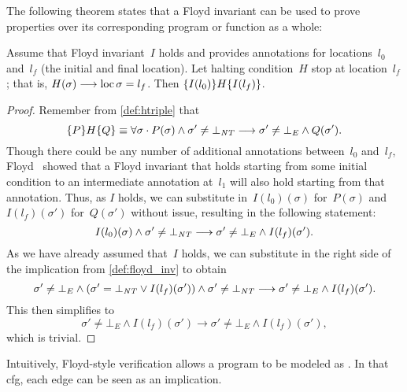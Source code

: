 The following theorem states that a Floyd invariant
can be used to prove properties over its corresponding program or function
as a whole:
\begin{theorem}
  Assume that Floyd invariant~$I$ holds and provides annotations for locations~$l_0$ and~$l_f$ (the initial and final location).
  Let halting condition~$H$ stop at location~$l_f$;
  that is, $H(\sigma)\longrightarrow\operatorname{loc}\sigma=l_f$.
  Then $\{I(l_0)\}H\{I(l_f)\}$.
\end{theorem}
\begin{proof}
  Remember from \cref{def:htriple} that
  \begin{equation*}
    \{P\}H\{Q\}\equiv\forall\sigma\cdot
    P(\sigma)\wedge\sigma'\neq\bot_{\mathit{NT}}\longrightarrow
    \sigma'\neq\bot_E\wedge Q(\sigma').
  \end{equation*}
  Though there could be any number of additional annotations between~$l_0$
  and~$l_f$, Floyd~\citep{floyd1967assigning} showed that a Floyd invariant that holds
  starting from some initial condition to an intermediate annotation at~$l_1$
  will also hold starting from that annotation.
  Thus, as $I$ holds, we can substitute in~$I(l_0)(\sigma)$ for~$P(\sigma)$
  and~$I(l_f)(\sigma')$ for~$Q(\sigma')$ without issue,
  resulting in the following statement:
  \begin{equation*}
      I(l_0)(\sigma)\wedge\sigma'\neq\bot_{\mathit{NT}}\longrightarrow
      \sigma'\neq\bot_E\wedge I(l_f)(\sigma').
  \end{equation*}
  As we have already assumed that~$I$ holds,
  we can substitute in the right side of the implication from \cref{def:floyd_inv}
  to obtain
  \begin{equation*}
    \sigma'\neq\bot_E\wedge(\sigma'=\bot_{\mathit{NT}}\vee I(l_f)(\sigma'))\wedge
    \sigma'\neq\bot_{\mathit{NT}}\longrightarrow
    \sigma'\neq\bot_E\wedge I(l_f)(\sigma').
  \end{equation*}
  This then simplifies to 
  \begin{equation*}
    \sigma'\neq\bot_E\wedge I(l_f)(\sigma')\longrightarrow
    \sigma'\neq\bot_E\wedge I(l_f)(\sigma'),
  \end{equation*}
  which is trivial.
\end{proof}

Intuitively, Floyd-style verification allows a program to be modeled as .
In that \ac{cfg}, each edge can be seen as an implication.

